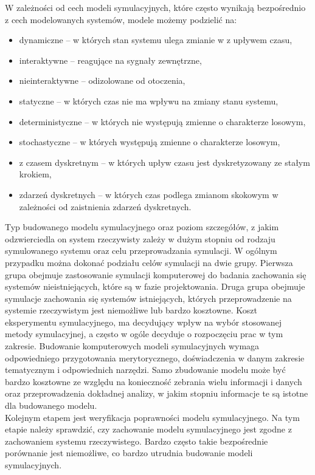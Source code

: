 \documentclass[10pt, a
4paper]{article}
\begin{document}
W zależności od cech modeli symulacyjnych, które często wynikają bezpośrednio z cech modelowanych systemów, modele możemy podzielić na:
\begin{itemize}
\item dynamiczne – w których stan systemu ulega zmianie w z upływem czasu,
\item interaktywne – reagujące na sygnały zewnętrzne,
\item nieinteraktywne – odizolowane od otoczenia,
\item statyczne – w których czas nie ma wpływu na zmiany stanu systemu,
\item deterministyczne – w których nie występują zmienne o charakterze losowym,
\item stochastyczne – w których występują zmienne o charakterze losowym,
\item z czasem dyskretnym – w których upływ czasu jest dyskretyzowany ze stałym krokiem,
\item zdarzeń dyskretnych – w których czas podlega zmianom skokowym w zależności od zaistnienia zdarzeń dyskretnych.
\end{itemize}
Typ budowanego modelu symulacyjnego oraz poziom szczegółów, z jakim odzwierciedla on system rzeczywisty zależy w dużym stopniu od rodzaju symulowanego systemu oraz celu przeprowadzania symulacji. W ogólnym przypadku można dokonać podziału celów symulacji na dwie grupy. Pierwsza grupa obejmuje zastosowanie symulacji komputerowej do badania zachowania się systemów nieistniejących, które są w fazie projektowania. Druga grupa obejmuje symulacje zachowania się systemów istniejących,
których przeprowadzenie na systemie rzeczywistym jest niemożliwe lub bardzo kosztowne. Koszt eksperymentu symulacyjnego, ma decydujący wpływ na wybór stosowanej metody symulacyjnej, a często w ogóle decyduje o rozpoczęciu prac w tym zakresie. Budowanie komputerowych modeli symulacyjnych wymaga odpowiedniego przygotowania merytorycznego, doświadczenia w danym zakresie tematycznym i odpowiednich narzędzi. Samo zbudowanie modelu może być bardzo kosztowne ze względu na konieczność zebrania wielu informacji i danych oraz przeprowadzenia dokładnej analizy, w jakim stopniu informacje te są istotne dla budowanego modelu.\\
\indent Kolejnym etapem jest weryfikacja poprawności modelu symulacyjnego. Na tym etapie należy sprawdzić, czy zachowanie modelu symulacyjnego jest zgodne z zachowaniem systemu rzeczywistego. Bardzo często takie bezpośrednie porównanie jest niemożliwe, co bardzo utrudnia budowanie modeli symulacyjnych.\\
\end{document}
